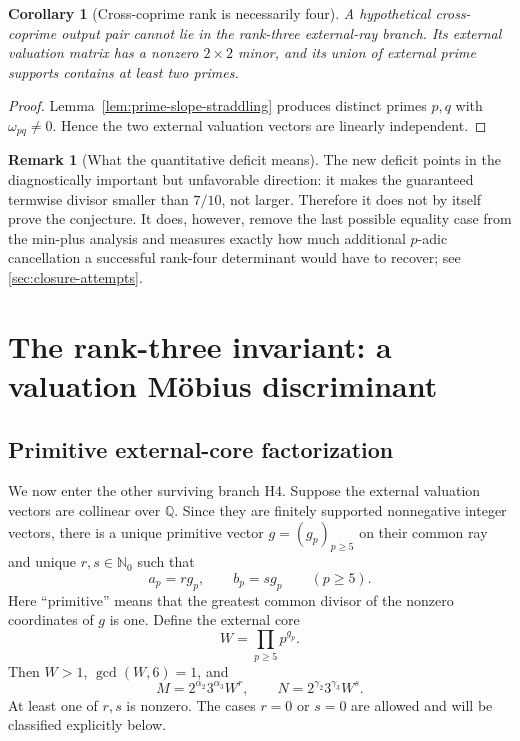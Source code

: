 \documentclass[11pt,oneside]{article}
\theoremstyle{research}
\newtheorem{corollary}[theorem]{Corollary}
\theoremstyle{definition}
\newtheorem{remark}[theorem]{Remark}
\newcommand{\Q}{\mathbb Q}
\newcommand{\N}{\mathbb N}
\begin{document}
\begin{corollary}[Cross-coprime rank is necessarily four]
\label{cor:cross-coprime-rank-four}
A hypothetical cross-coprime output pair cannot lie in the rank-three
external-ray branch.  Its external valuation matrix has a nonzero
$2\times2$ minor, and its union of external prime supports contains at least
two primes.
\end{corollary}

\begin{proof}
Lemma~\ref{lem:prime-slope-straddling} produces distinct primes $p,q$ with
$\omega_{pq}\ne0$.  Hence the two external valuation vectors are linearly
independent.
\end{proof}

\begin{remark}[What the quantitative deficit means]
The new deficit points in the diagnostically important but unfavorable
direction: it makes the guaranteed termwise divisor smaller than $7/10$, not
larger.  Therefore it does not by itself prove the conjecture.  It does,
however, remove the last possible equality case from the min-plus analysis and
measures exactly how much additional $p$-adic cancellation a successful
rank-four determinant would have to recover; see
\cref{sec:closure-attempts}.
\end{remark}

\section{The rank-three invariant: a valuation M\"obius discriminant}
\label{sec:mobius}

\subsection{Primitive external-core factorization}

We now enter the other surviving branch H4.  Suppose the external valuation
vectors are collinear over $\Q$.  Since they are finitely supported
nonnegative integer vectors, there is a unique primitive vector
$g=(g_p)_{p\ge5}$ on their common ray and unique $r,s\in\N_0$ such that
\[
 a_p=rg_p,
 \qquad
 b_p=sg_p
 \qquad(p\ge5).
\]
Here ``primitive'' means that the greatest common divisor of the nonzero
coordinates of $g$ is one.  Define the external core
\begin{equation}
 W=\prod_{p\ge5}p^{g_p}.
 \label{eq:W-core}
\end{equation}
Then $W>1$, $\gcd(W,6)=1$, and
\begin{equation}
 \boxed{
 M=2^{\alpha_2}3^{\alpha_3}W^r,
 \qquad
 N=2^{\gamma_2}3^{\gamma_3}W^s.}
 \label{eq:rank3-factorization}
\end{equation}
At least one of $r,s$ is nonzero.  The cases $r=0$ or $s=0$ are allowed and
will be classified explicitly below.
\end{document}
